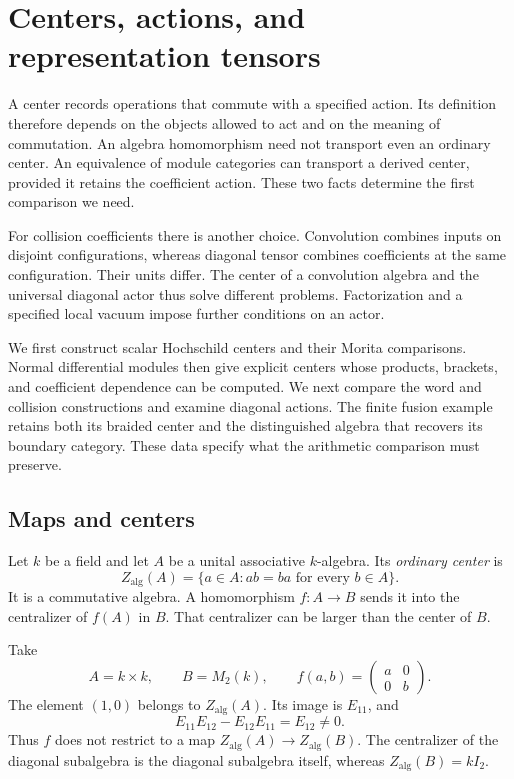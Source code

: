 \chapter{Centers, actions, and representation tensors}
\label{v4-arith:centers:chapter}

A center records operations that commute with a specified action.
Its definition therefore depends on the objects allowed to act and
on the meaning of commutation. An algebra homomorphism need not
transport even an ordinary center. An equivalence of module
categories can transport a derived center, provided it retains the
coefficient action. These two facts determine the first comparison
we need.

For collision coefficients there is another choice. Convolution
combines inputs on disjoint configurations, whereas diagonal tensor
combines coefficients at the same configuration. Their units differ.
The center of a convolution algebra and the universal diagonal actor
thus solve different problems. Factorization and a specified local
vacuum impose further conditions on an actor.

We first construct scalar Hochschild centers and their Morita
comparisons. Normal differential modules then give explicit centers
whose products, brackets, and coefficient dependence can be computed.
We next compare the word and collision constructions and examine
diagonal actions. The finite fusion example retains both its braided
center and the distinguished algebra that recovers its boundary
category. These data specify what the arithmetic comparison must
preserve.

\section{Maps and centers}
\label{v4-arith:centers:sec:maps}

Let $k$ be a field and let $A$ be a unital associative $k$-algebra.
Its \emph{ordinary center} is
\[
 Z_{\mathrm{alg}}(A)=\{a\in A:ab=ba\text{ for every }b\in A\}.
\]
It is a commutative algebra. A homomorphism $f:A\to B$ sends it
into the centralizer of $f(A)$ in $B$. That centralizer can be
larger than the center of $B$.

\begin{example}
\label{v4-arith:centers:ex:diagonal}
Take
\[
 A=k\times k,\qquad B=M_2(k),\qquad
 f(a,b)=
 \begin{pmatrix}a&0\\0&b\end{pmatrix}.
\]
The element $(1,0)$ belongs to $Z_{\mathrm{alg}}(A)$.
Its image is $E_{11}$, and
\[
 E_{11}E_{12}-E_{12}E_{11}=E_{12}\ne0.
\]
Thus $f$ does not restrict to a map
$Z_{\mathrm{alg}}(A)\to Z_{\mathrm{alg}}(B)$.
The centralizer of the diagonal subalgebra is the diagonal
subalgebra itself, whereas $Z_{\mathrm{alg}}(B)=kI_2$.
\end{example}

